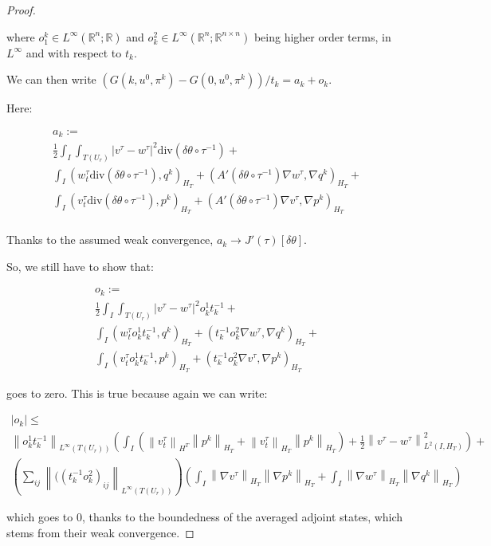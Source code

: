 \documentclass[english,a4paper,12pt,oneside]{scrbook}
\theoremstyle{break}
\newenvironment{mproof}[1][\proofname]{%
  \begin{proof}[#1]$ $\par\nobreak\ignorespaces
}{%
  \end{proof}
}
\renewcommand*{\proofname}{Proof}
\theoremstyle{remark}
\newcommand{\mR}{\mathbb{R}}
\newcommand{\norm}[1]{\left\lVert#1\right\rVert}
\newcommand{\te}{\theta}
\newcommand{\dive}{\text{div}}
\begin{document}
\begin{mproof}
where $o_1^k \in L^\infty(\mR^n;\mR)$ and $o^2_k \in L^\infty(\mR^n;\mR^{n\times n})$ being higher order terms, in $L^\infty$ and with respect to $t_k$.

We can then write $(G(k,u^0,\pi^k)-G(0,u^0,\pi^k))/t_k = a_k + o_k$.

Here:

\begin{align*}
a_k :=\\
\frac{1}{2}\int_I \int_{T(U_r)}|v^\tau-w^\tau|^2\dive(\delta \te \circ \tau^{-1})+\\
\int_I ( w_t^\tau \dive(\delta \te \circ \tau^{-1}), q^k)_{H_T}+ (A'(\delta \te \circ \tau^{-1}) \nabla w^\tau, \nabla q^k)_{H_T}+\\
\int_I (v_t^\tau \dive(\delta \te \circ \tau^{-1}),p^k )_{H_T} + (A'(\delta \te \circ \tau^{-1})  \nabla v^\tau, \nabla p^k)_{H_T} \\
\end{align*}

Thanks to the assumed weak convergence, $a_k\rightarrow J'(\tau)[\delta \te]$.

So, we still have to show that:

\begin{align*}
o_k:=\\
\frac{1}{2}\int_I \int_{T(U_r)}|v^\tau-w^\tau|^2 o^1_k t_k^{-1}+\\
\int_I ( w_t^\tau o^1_kt_k^{-1}, q^k)_{H_T}+ (t_k^{-1}o^2_k\nabla w^\tau, \nabla q^k)_{H_T}+\\
\int_I (v_t^\tau o^1_k t_k^{-1},p^k )_{H_T} + (t_k^{-1}o^2_k \nabla v^\tau, \nabla p^k)_{H_T} 
\end{align*}

goes to zero. This is true because again we can write:

\begin{align*}
|o_k| \leq\\ \norm{ o^1_kt_k^{-1}}_{L^\infty(T(U_r))}\left (\int_I( \norm{v_t^\tau}_{H^T}\norm{p^k}_{H_T}+ \norm{v_t^\tau}_{H_T}\norm{p^k}_{H_T})+\frac{1}{2}\norm{v^\tau-w^\tau}^2_{L^2(I,H_T)}\right )+\\
\left(\sum_{ij} \norm{((t_k^{-1}o^2_k)_{ij}}_{L^\infty(T(U_r))}\right )\left (
\int_I \norm{\nabla v^\tau}_{H_T} \norm{\nabla p^k}_{H_T}+ \int_I \norm{\nabla w^\tau}_{H_T} \norm{\nabla q^k}_{H_T}\right )
\end{align*}

which goes to $0$, thanks to the boundedness of the averaged adjoint states, which stems from their weak convergence.


\end{mproof}
\end{document}
